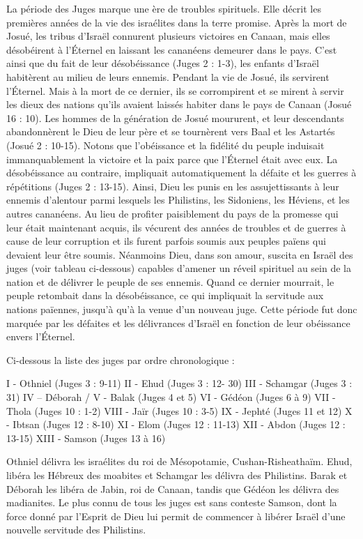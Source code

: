 La période des Juges marque une ère de troubles spirituels. Elle décrit les premières années de la vie des israélites dans la terre promise.
Après la mort de Josué, les tribus d'Israël connurent plusieurs victoires en Canaan, mais elles désobéirent à l’Éternel en laissant les cananéens demeurer dans le pays. C'est ainsi que du fait de leur désobéissance (Juges 2 : 1-3), les enfants d'Israël habitèrent au milieu de leurs ennemis.
Pendant la vie de Josué, ils servirent l’Éternel. Mais à la mort de ce dernier, ils se corrompirent et se mirent à servir les dieux des nations qu'ils avaient laissés habiter dans le pays de Canaan (Josué 16 : 10). Les hommes de la génération de Josué moururent, et leur descendants abandonnèrent le Dieu de leur père et se tournèrent vers Baal et les Astartés (Josué 2 : 10-15). Notons que l'obéissance et la fidélité du peuple induisait immanquablement la victoire et la paix parce que l’Éternel était avec eux. La désobéissance au contraire, impliquait automatiquement la défaite et les guerres à répétitions (Juges 2 : 13-15). Ainsi, Dieu les punis en les assujettissants à leur ennemis d'alentour parmi lesquels les Philistins, les Sidoniens, les Héviens, et les autres cananéens. Au lieu de profiter paisiblement du pays de la promesse qui leur était maintenant acquis, ils vécurent des années de troubles et de guerres à cause de leur corruption et ils furent parfois soumis aux peuples païens qui devaient leur être soumis.
Néanmoins Dieu, dans son amour, suscita en Israël des juges (voir tableau ci-dessous) capables d'amener un réveil spirituel au sein de la nation et de délivrer le peuple de ses ennemis. Quand ce dernier mourrait, le peuple retombait dans la désobéissance, ce qui impliquait la servitude aux nations païennes, jusqu'à qu'à la venue d'un nouveau juge. Cette période fut donc marquée par les défaites et les délivrances d'Israël en fonction de leur obéissance envers l’Éternel.


Ci-dessous la liste des juges par ordre chronologique :

I - Othniel
(Juges 3 : 9-11)
II - Ehud
(Juges 3 : 12- 30)
III - Schamgar
(Juges 3 : 31)
IV – Déborah / V - Balak
(Juges 4 et 5)
VI - Gédéon
(Juges 6 à 9)
VII - Thola
(Juges 10 : 1-2)
VIII - Jaïr
(Juges 10 : 3-5)
IX - Jephté
(Juges 11 et 12)
X - Ibtsan
(Juges 12 : 8-10)
XI - Elom
(Juges 12 : 11-13)
XII - Abdon
(Juges 12 : 13-15)
XIII - Samson
(Juges 13 à 16)

Othniel délivra les israélites du roi de Mésopotamie, Cushan-Risheathaïm. Ehud, libéra les Hébreux des moabites et Schamgar les délivra des Philistins. Barak et Déborah les libéra de Jabin, roi de Canaan, tandis que Gédéon les délivra des madianites.
Le plus connu de tous les juges est sans conteste Samson, dont la force donné par l'Esprit de Dieu lui permit de commencer à libérer Israël d'une nouvelle servitude des Philistins.

